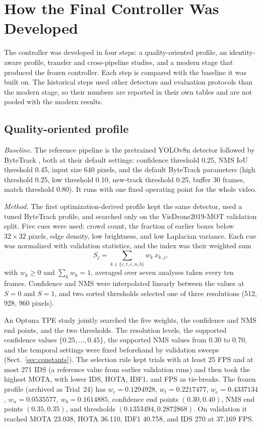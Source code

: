 \section{How the Final Controller Was Developed}\label{sec:development}

The controller was developed in four steps: a quality-oriented profile, an
identity-aware profile, transfer and cross-pipeline studies, and a modern
stage that produced the frozen controller. Each step is compared with the
baseline it was built on. The historical steps used other detectors and
evaluation protocols than the modern stage, so their numbers are reported in
their own tables and are not pooled with the modern results.

\subsection{Quality-oriented profile}\label{sec:quality}

\emph{Baseline.} The reference pipeline is the pretrained YOLOv8n detector
\cite{jocher2023yolov8} followed by ByteTrack \cite{zhang2022bytetrack}, both at
their default settings: confidence threshold 0.25, NMS IoU threshold 0.45,
input size 640 pixels, and the default ByteTrack parameters (high threshold
0.25, low threshold 0.10, new-track threshold 0.25, buffer 30 frames, match
threshold 0.80). It runs with one fixed operating point for the whole video.

\emph{Method.} The first optimization-derived profile kept the same detector,
used a tuned ByteTrack profile, and searched only on the VisDrone2019-MOT
validation split. Five cues were used: crowd count, the fraction of earlier
boxes below $32\times32$ pixels, edge density, low brightness, and low
Laplacian variance. Each cue was normalized with validation statistics, and
the index was their weighted sum
\begin{equation}
S_j=\sum_{k\in\{c,t,e,n,b\}}w_k\,x_{k,j},
\label{eq:hist-sci}
\end{equation}
with $w_k\geq0$ and $\sum_k w_k=1$, averaged over seven analyses taken every
ten frames. Confidence and NMS were interpolated linearly between the values
at $S=0$ and $S=1$, and two sorted thresholds selected one of three
resolutions (512, 928, 960 pixels).

An Optuna TPE study \cite{akiba2019optuna} jointly searched the five weights,
the confidence and NMS end points, and the two thresholds. The resolution
levels, the supported confidence values $\{0.25,\dots,0.45\}$, the supported
NMS values from 0.30 to 0.70, and the temporal settings were fixed beforehand
by validation sweeps (Sect.~\ref{sec:constants}). The selection rule kept
trials with at least 25 FPS and at most 271 IDS (a reference value from
earlier validation runs) and then took the highest MOTA, with lower IDS, HOTA,
IDF1, and FPS as tie-breaks. The frozen profile (archived as Trial~24) has
$w_c=0.1294928$, $w_t=0.2217477$, $w_e=0.4337134$, $w_n=0.0535577$,
$w_b=0.1614885$, confidence end points $(0.30,0.40)$, NMS end points
$(0.35,0.35)$, and thresholds $(0.1353494, 0.2872868)$. On validation it
reached MOTA 23.038, HOTA 36.110, IDF1 40.758, and IDS 270 at 37.169 FPS.

